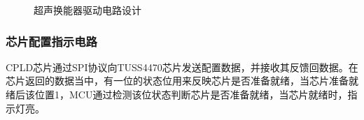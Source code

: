 \begin{figure}[ht]
	\centering
	\caption{超声换能器驱动电路设计}
	\label{超声换能器驱动电路设计}
\end{figure}
\subsubsection{芯片配置指示电路}
CPLD芯片通过SPI协议向TUSS4470芯片发送配置数据，并接收其反馈回数据。在芯片返回的数据当中，有一位的状态位用来反映芯片是否准备就绪，当芯片准备就绪后该位置1，MCU通过检测该位状态判断芯片是否准备就绪，当芯片就绪时，指示灯亮。
